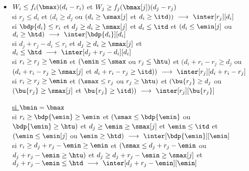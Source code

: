 \documentclass{report}
\begin{document}
\begin{itemize}
\vspace{0.5cm}

\item $W_i\le f_i(\bmax)(d_i-r_i)$ et $W_j \ge f_j(\bmax[j])(d_j-r_j)$\\
\vspace{0.2cm}
si $r_j \le d_i$ et $(d_i \ge d_j$ ou $(d_i \ge \smax[j]$ et $d_i \ge \itd))\ 
\longrightarrow\ \inter[r_j][d_i]$\\
\vspace{0.1cm}
si $\bdp{d_i} \le r_i$ et $d_j \ge d_i \ge \smax[j]$ et $d_i \le \itd$ et
  $(d_i \le \emin[j]$ ou $d_i \ge \htd)\ \longrightarrow\ 
\inter[\bdp{d_i}][d_i]$\\
\vspace{0.1cm}
si $d_j+r_j-d_i \le r_i$ et $d_j \ge d_i \ge \smax[j]$ et 
$d_i\le \htd\ \longrightarrow\ \inter[d_j+r_j-d_i][d_i]$\\
\vspace{0.1cm}
si $r_i \ge r_j \ge \emin$ et $(\emin \le \smax$ ou $r_j\le \htu)$ et 
  $(d_i+r_i-r_j \ge d_j$ ou $(d_i+r_i-r_j \ge \smax[j]$ et 
$d_i+r_i-r_j \ge \itd))\ 
\longrightarrow\ \inter[r_j][d_i+r_i-r_j]$\\
\vspace{0.1cm}
si $r_i \ge r_j \ge \emin$ et $(\smax \le r_j$ ou $ r_j \ge \htu)$ et   $(\bu{r_j} \ge d_j$ ou $(\bu{r_j} \ge \smax[j]$ et  
$\bu{r_j} \ge \itd))\ \longrightarrow\ \inter[r_j][\bu{r_j}]$\\

\vspace{0.25cm}

\underline{si $\bmin=\bmax$}\\
\vspace{0.2cm}
si $r_i \ge \bdp{\emin} \ge \emin$ et 
$(\smax \le \bdp{\emin}$ ou  $ \bdp{\emin} \ge \htu)$ et 
$d_j \ge \emin \ge \smax[j]$ et   $\emin \le \itd$ et 
$(\emin \le \emin[j]$ ou $\emin \ge \htd)\ \longrightarrow\ 
  \inter[\bdp{\emin}][\emin]$\\
\vspace{0.1cm}
si $r_i \ge d_j+r_j-\emin \ge \emin$ et 
$(\smax \le d_j+r_j-\emin$ ou $ d_j+r_j-\emin \ge \htu)$ et 
$d_j \ge d_j+r_j-\emin \ge \smax[j]$ et 
$d_j+r_j-\emin\le \htd\ \longrightarrow\ \inter[d_j+r_j-\emin][\emin]$\\

\vspace{0.5cm}


\end{itemize}
\end{document}
